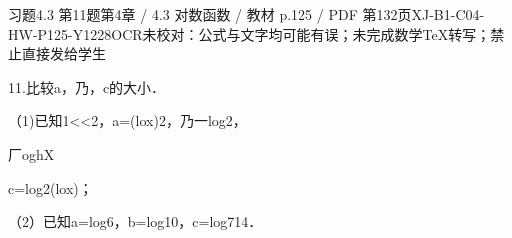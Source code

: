\begin{bankitem}{习题4.3 第11题}{第4章 / 4.3 对数函数 / 教材 p.125 / PDF 第132页}{XJ-B1-C04-HW-P125-Y1228}{OCR未校对：公式与文字均可能有误；未完成数学TeX转写；禁止直接发给学生}
\begin{ocrdraft}
\par
11.比较a，乃，c的大小．
\par
（1)已知1<<2，a=(lox)2，乃一log2，
\par
厂oghX
\par
c=log2(lox)；
\par
（2）已知a=log6，b=log10，c=log714．
\end{ocrdraft}
\end{bankitem}
